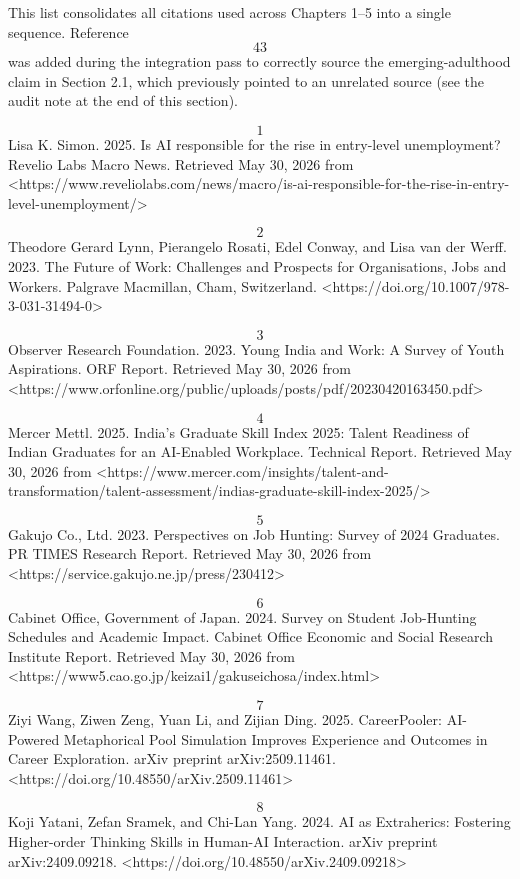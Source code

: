 This list consolidates all citations used across Chapters 1--5 into a single sequence. Reference \[43\] was added during the integration pass to correctly source the emerging-adulthood claim in Section 2.1, which previously pointed to an unrelated source (see the audit note at the end of this section).

\textbf{\[1\]} Lisa K. Simon. 2025. Is AI responsible for the rise in entry-level unemployment? Revelio Labs Macro News. Retrieved May 30, 2026 from <https://www.reveliolabs.com/news/macro/is-ai-responsible-for-the-rise-in-entry-level-unemployment/>

\textbf{\[2\]} Theodore Gerard Lynn, Pierangelo Rosati, Edel Conway, and Lisa van der Werff. 2023. The Future of Work: Challenges and Prospects for Organisations, Jobs and Workers. Palgrave Macmillan, Cham, Switzerland. <https://doi.org/10.1007/978-3-031-31494-0>

\textbf{\[3\]} Observer Research Foundation. 2023. Young India and Work: A Survey of Youth Aspirations. ORF Report. Retrieved May 30, 2026 from <https://www.orfonline.org/public/uploads/posts/pdf/20230420163450.pdf>

\textbf{\[4\]} Mercer Mettl. 2025. India's Graduate Skill Index 2025: Talent Readiness of Indian Graduates for an AI-Enabled Workplace. Technical Report. Retrieved May 30, 2026 from <https://www.mercer.com/insights/talent-and-transformation/talent-assessment/indias-graduate-skill-index-2025/>

\textbf{\[5\]} Gakujo Co., Ltd. 2023. Perspectives on Job Hunting: Survey of 2024 Graduates. PR TIMES Research Report. Retrieved May 30, 2026 from <https://service.gakujo.ne.jp/press/230412>

\textbf{\[6\]} Cabinet Office, Government of Japan. 2024. Survey on Student Job-Hunting Schedules and Academic Impact. Cabinet Office Economic and Social Research Institute Report. Retrieved May 30, 2026 from <https://www5.cao.go.jp/keizai1/gakuseichosa/index.html>

\textbf{\[7\]} Ziyi Wang, Ziwen Zeng, Yuan Li, and Zijian Ding. 2025. CareerPooler: AI-Powered Metaphorical Pool Simulation Improves Experience and Outcomes in Career Exploration. arXiv preprint arXiv:2509.11461. <https://doi.org/10.48550/arXiv.2509.11461>

\textbf{\[8\]} Koji Yatani, Zefan Sramek, and Chi-Lan Yang. 2024. AI as Extraherics: Fostering Higher-order Thinking Skills in Human-AI Interaction. arXiv preprint arXiv:2409.09218. <https://doi.org/10.48550/arXiv.2409.09218>

